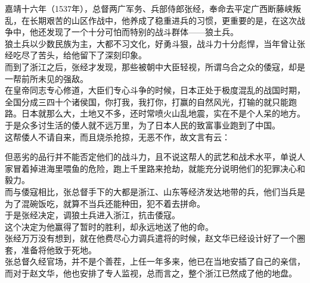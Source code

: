 \begin{multicols}{\theparacolNo}
嘉靖十六年（1537年），总督两广军务、兵部侍郎张经，奉命去平定广西断藤峡叛乱，在长期艰苦的山区作战中，他养成了稳重进兵的习惯，更重要的是，在这次战争中，他还发现了一个十分可怕而特别的战斗群体——狼土兵。\\

狼土兵以少数民族为主，大都不习文化，好勇斗狠，战斗力十分彪悍，当年曾让张经吃尽了苦头，给他留下了深刻印象。\\

而到了浙江之后，张经才发现，那些被朝中大臣轻视，所谓乌合之众的倭寇，却是一帮前所未见的强敌。\\

在皇帝同志专心修道，大臣们专心斗争的时候，日本正处于极度混乱的战国时期，全国分成三四十个诸侯国，你打我，我打你，打赢的自然风光，打输的就只能跑路。日本就那么大，土地又不多，还时常喷火山乱地震，实在不是个人呆的地方。于是众多讨生活的倭人就不远万里，为了日本人民的致富事业跑到了中国。\\

这帮倭人不请自来，而且烧杀抢掠，无恶不作，故文言有云：\\

\begin{quote}
	\begin{spacing}{0.5}  %
		\textit{{\footnotesize
				\begin{description}
					\item[\textcolor{Gray}{\FA }] 倭人为寇，是为倭寇。
				\end{description}
		}}
	\end{spacing}
\end{quote}

但恶劣的品行并不能否定他们的战斗力，且不说这帮人的武艺和战术水平，单说人家冒着掉进海里喂鱼的危险，跑上千里路来抢劫，就能充分说明他们的犯罪决心和毅力。\\

而与倭寇相比，张总督手下的大都是浙江、山东等经济发达地带的兵，他们当兵是为了混碗饭吃，就算不当兵还能种田，犯不着去拼命。\\

于是张经决定，调狼土兵进入浙江，抗击倭寇。\\

这个决定为他赢得了暂时的胜利，却永远地送了他的命。\\

张经万万没有想到，就在他费尽心力调兵遣将的时候，赵文华已经设计好了一个圈套，准备将他致于死地。\\

张总督久经官场，并不是个善茬，上任一年多来，他已在当地安插了自己的亲信，而对于赵文华，他也安排了专人监视，总而言之，整个浙江已然成了他的地盘。\\


\end{multicols}
